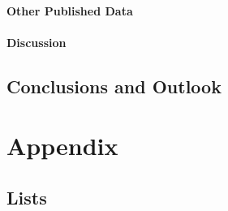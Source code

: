 \documentclass  [
  paper    = a4,
  BCOR     = 10mm,
  twoside,
  fontsize = 12pt,
  fleqn,
  toc      = bibnumbered,
  toc      = listofnumbered,
  numbers  = noendperiod,
  headings = normal,
  listof   = leveldown,
  version  = 3.03
]                                       {scrreprt}
\begin{document}
		\subsection{Other Published Data}
		\subsection{Discussion}
  \newpage
  \chapter{Conclusions and Outlook}\label{cha:conclusions}





  \part{Appendix}
  \begin{appendix}
  
    \chapter{Lists}
    \listoffigures
    \listoftables
      
    
    
    
    
    
  \end{appendix}
  
\end{document}

